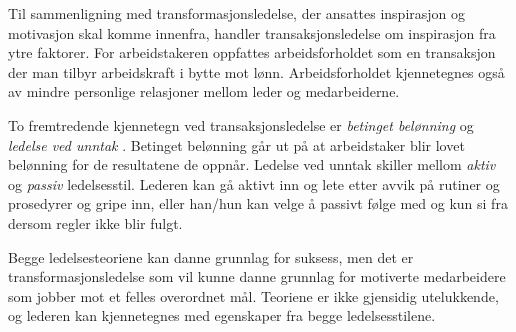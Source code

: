 \indent \newline
Til sammenligning med transformasjonsledelse, der ansattes inspirasjon og motivasjon skal komme innenfra, handler transaksjonsledelse om inspirasjon fra ytre faktorer. For arbeidstakeren oppfattes arbeidsforholdet som en transaksjon der man tilbyr arbeidskraft i bytte mot lønn. Arbeidsforholdet kjennetegnes også av mindre personlige relasjoner mellom leder og medarbeiderne.

\indent \newline
To fremtredende kjennetegn ved transaksjonsledelse er \textit{betinget belønning} og \textit{ledelse ved unntak} \cite[s.~76]{PerspektiverLedelse}. Betinget belønning går ut på at arbeidstaker blir lovet belønning for de resultatene de oppnår. Ledelse ved unntak skiller mellom \textit{aktiv} og \textit{passiv} ledelsesstil. Lederen kan gå aktivt inn og lete etter avvik på rutiner og prosedyrer og gripe inn, eller han/hun kan velge å passivt følge med og kun si fra dersom regler ikke blir fulgt. 

\indent \newline
Begge ledelsesteoriene kan danne grunnlag for suksess, men det er transformasjonsledelse som vil kunne danne grunnlag for motiverte medarbeidere som jobber mot et felles overordnet mål. Teoriene er ikke gjensidig utelukkende, og lederen kan kjennetegnes med egenskaper fra begge ledelsesstilene. 

